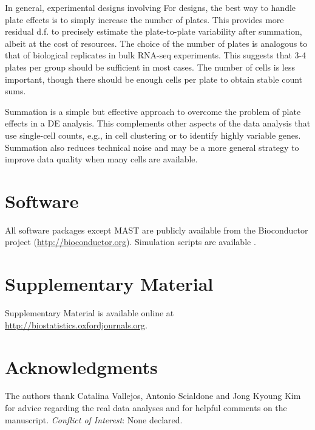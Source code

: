 \documentclass[oupdraft]{bio}
\begin{document}
In general, experimental designs involving 
For  designs, the best way to handle plate effects is to simply increase the number of plates.
This provides more residual d.f. to precisely estimate the plate-to-plate variability after summation, albeit at the cost of  resources.
The choice of the number of plates is analogous to that of biological replicates in bulk RNA-seq experiments.
This suggests that 3-4 plates per group should be sufficient in most cases.
The number of cells is less important, though there should be enough cells per plate to obtain stable count sums.

Summation is a simple but effective approach to overcome the problem of plate effects in a DE analysis. 
This complements other aspects of the data analysis that use single-cell counts, e.g., in cell clustering or to identify highly variable genes.
Summation also reduces technical noise and may be a more general strategy to improve data quality when many cells are available.

\section{Software}
All software packages except MAST are publicly available from the Bioconductor project (\url{http://bioconductor.org}).
Simulation scripts are available .

\section{Supplementary Material}
Supplementary Material is available online at \href{http://biostatistics.oxfordjournals.org}{http://biostatistics.oxfordjournals.org}.

\section*{Acknowledgments}
The authors thank Catalina Vallejos, Antonio Scialdone and Jong Kyoung Kim for advice regarding the real data analyses and for helpful comments on the manuscript.
{\it Conflict of Interest}: None declared.
\end{document}

